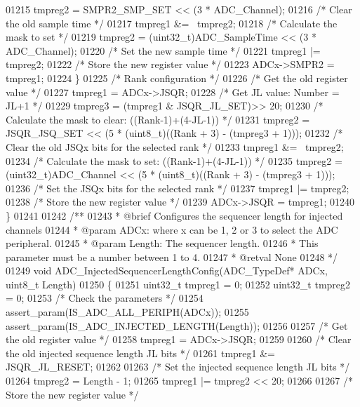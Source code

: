 \begin{DoxyCode}
01215     tmpreg2 = SMPR2_SMP_SET << (3 * ADC\_Channel);
01216     \textcolor{comment}{/* Clear the old sample time */}
01217     tmpreg1 &= ~tmpreg2;
01218     \textcolor{comment}{/* Calculate the mask to set */}
01219     tmpreg2 = (uint32\_t)ADC\_SampleTime << (3 * ADC\_Channel);
01220     \textcolor{comment}{/* Set the new sample time */}
01221     tmpreg1 |= tmpreg2;
01222     \textcolor{comment}{/* Store the new register value */}
01223     ADCx->SMPR2 = tmpreg1;
01224   \}
01225   \textcolor{comment}{/* Rank configuration */}
01226   \textcolor{comment}{/* Get the old register value */}
01227   tmpreg1 = ADCx->JSQR;
01228   \textcolor{comment}{/* Get JL value: Number = JL+1 */}
01229   tmpreg3 =  (tmpreg1 & JSQR_JL_SET)>> 20;
01230   \textcolor{comment}{/* Calculate the mask to clear: ((Rank-1)+(4-JL-1)) */}
01231   tmpreg2 = JSQR_JSQ_SET << (5 * (uint8\_t)((Rank + 3) - (tmpreg3 + 1)));
01232   \textcolor{comment}{/* Clear the old JSQx bits for the selected rank */}
01233   tmpreg1 &= ~tmpreg2;
01234   \textcolor{comment}{/* Calculate the mask to set: ((Rank-1)+(4-JL-1)) */}
01235   tmpreg2 = (uint32\_t)ADC\_Channel << (5 * (uint8\_t)((Rank + 3) - (tmpreg3 + 1)));
01236   \textcolor{comment}{/* Set the JSQx bits for the selected rank */}
01237   tmpreg1 |= tmpreg2;
01238   \textcolor{comment}{/* Store the new register value */}
01239   ADCx->JSQR = tmpreg1;
01240 \}
01241 
01242 \textcolor{comment}{/**}
01243 \textcolor{comment}{  * @brief  Configures the sequencer length for injected channels}
01244 \textcolor{comment}{  * @param  ADCx: where x can be 1, 2 or 3 to select the ADC peripheral.}
01245 \textcolor{comment}{  * @param  Length: The sequencer length. }
01246 \textcolor{comment}{  *          This parameter must be a number between 1 to 4.}
01247 \textcolor{comment}{  * @retval None}
01248 \textcolor{comment}{  */}
01249 \textcolor{keywordtype}{void} ADC_InjectedSequencerLengthConfig(ADC\_TypeDef* ADCx, uint8\_t Length)
01250 \{
01251   uint32\_t tmpreg1 = 0;
01252   uint32\_t tmpreg2 = 0;
01253   \textcolor{comment}{/* Check the parameters */}
01254   assert_param(IS\_ADC\_ALL\_PERIPH(ADCx));
01255   assert_param(IS\_ADC\_INJECTED\_LENGTH(Length));
01256 
01257   \textcolor{comment}{/* Get the old register value */}
01258   tmpreg1 = ADCx->JSQR;
01259 
01260   \textcolor{comment}{/* Clear the old injected sequence length JL bits */}
01261   tmpreg1 &= JSQR_JL_RESET;
01262 
01263   \textcolor{comment}{/* Set the injected sequence length JL bits */}
01264   tmpreg2 = Length - 1;
01265   tmpreg1 |= tmpreg2 << 20;
01266 
01267   \textcolor{comment}{/* Store the new register value */}

\end{DoxyCode}
